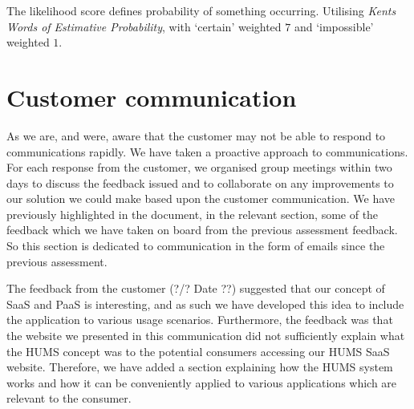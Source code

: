 \documentclass[10pt,a4paper]{article}
\begin{document}


The likelihood score defines probability of something occurring. Utilising
\textit{Kents Words of Estimative Probability}\cite{kent1966strategic}, with
`certain' weighted $7$ and `impossible' weighted $1$.




\section{Customer communication}
As we are, and were, aware that the customer may not be able to respond to communications rapidly. We have taken a proactive approach to communications. For each response from the customer, we organised group meetings within two days to discuss the feedback issued and to collaborate on any improvements to our solution we could make based upon the customer communication. We have previously highlighted in the document, in the relevant section, some of the feedback which we have taken on board from the previous assessment feedback. So this section is dedicated to communication in the form of emails since the previous assessment.

The feedback from the customer (?/? Date ??) suggested that our concept of SaaS and PaaS is interesting, and as such we have developed this idea to include the application to various usage scenarios. Furthermore, the feedback was that the website we presented in this communication did not sufficiently explain what the HUMS concept was to the potential consumers accessing our HUMS SaaS website. Therefore, we have added a section explaining how the HUMS system works and how it can be conveniently applied to various applications which are relevant to the consumer.

\vfill


\end{document}
